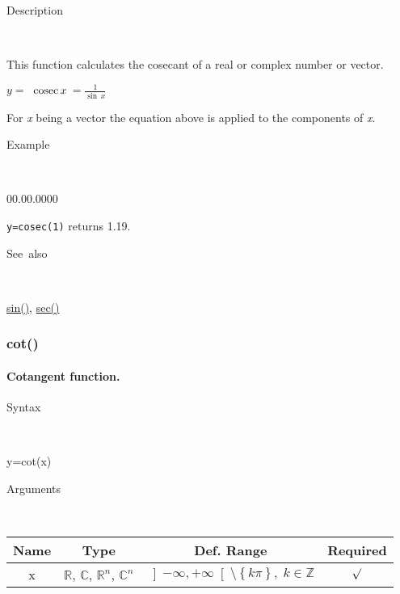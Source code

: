 \begin{description}
\item [Description]~
\end{description}
This function calculates the cosecant of a real or complex number
or vector.

\medskip{}
$y=$$\textrm{\, cosec}\, x\,$$={\displaystyle \frac{1}{\sin\, x}}$
\medskip{}

\noindent For \textit{x} being a vector the equation above is applied
to the components of \textit{x}.

\begin{description}
\item [Example]~
\end{description}
\begin{lyxlist}{00.00.0000}
\item [\texttt{y=cosec(1)}]returns 1.19.
\end{lyxlist}
\begin{description}
\item [See~also]~
\end{description}
\textcolor{blue}{\hyperlink{sin}{sin()}}\textcolor{black}{,} \textcolor{blue}{\hyperlink{sec}{sec()}}


\newpage
\subsubsection*{\hypertarget{cot}{}{\Large cot()}}


\paragraph{\label{par:Cotangent}Cotangent function.}

\begin{description}
\item [Syntax]~
\end{description}
y=cot(x)

\begin{description}
\item [Arguments]~
\end{description}
\begin{tabular}{|c|c|c|c|}
\hline 
Name&
Type&
Def. Range&
Required\tabularnewline
\hline
\hline 
x&
$\mathbb{R}$, $\mathbb{C}$, $\mathbb{R}^{n}$, $\mathbb{C}^{n}$&
$\left]-\infty,+\infty\right[\setminus\left\{ k\pi\right\} ,\; k\in\mathbb{Z}$&
$\surd$\tabularnewline
\hline
\end{tabular}

